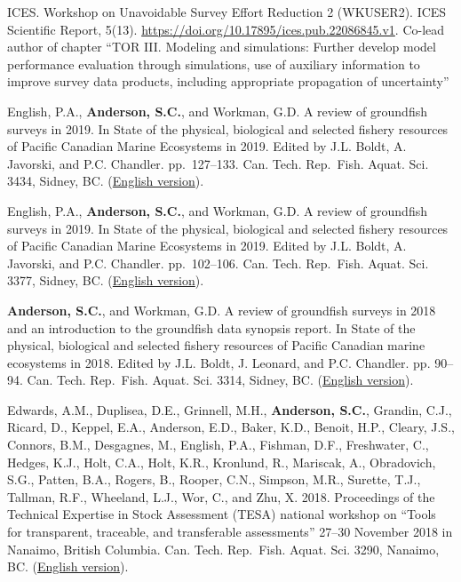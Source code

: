 \begin{description}
\tightlist
\item[2023]
ICES. Workshop on Unavoidable Survey Effort Reduction 2 (WKUSER2). ICES
Scientific Report, 5(13).
\url{https://doi.org/10.17895/ices.pub.22086845.v1}. Co-lead author of
chapter ``TOR III. Modeling and simulations: Further develop model
performance evaluation through simulations, use of auxiliary information
to improve survey data products, including appropriate propagation of
uncertainty''
\item[2021]
English, P.A., \textbf{Anderson, S.C.}, and Workman, G.D. A review of
groundfish surveys in 2019. In State of the physical, biological and
selected fishery resources of Pacific Canadian Marine Ecosystems in
2019. Edited by J.L. Boldt, A. Javorski, and P.C. Chandler.
pp.\ 127--133. Can. Tech. Rep.\ Fish. Aquat. Sci. 3434, Sidney, BC.
(\href{https://publications.gc.ca/site/eng/9.900827/publication.html}{English
version}).
\item[2020]
English, P.A., \textbf{Anderson, S.C.}, and Workman, G.D. A review of
groundfish surveys in 2019. In State of the physical, biological and
selected fishery resources of Pacific Canadian Marine Ecosystems in
2019. Edited by J.L. Boldt, A. Javorski, and P.C. Chandler.
pp.\ 102--106. Can. Tech. Rep.\ Fish. Aquat. Sci. 3377, Sidney, BC.
(\href{https://www.dfo-mpo.gc.ca/oceans/publications/soto-rceo/2019/index-eng.html}{English
version}).
\item[2019]
\textbf{Anderson, S.C.}, and Workman, G.D. A review of groundfish
surveys in 2018 and an introduction to the groundfish data synopsis
report. In State of the physical, biological and selected fishery
resources of Pacific Canadian marine ecosystems in 2018. Edited by J.L.
Boldt, J. Leonard, and P.C. Chandler. pp. 90--94. Can. Tech. Rep.\ Fish.
Aquat. Sci. 3314, Sidney, BC.
(\href{https://www.dfo-mpo.gc.ca/oceans/publications/soto-rceo/2018/index-eng.html}{English
version}).
\item[2018]
Edwards, A.M., Duplisea, D.E., Grinnell, M.H., \textbf{Anderson, S.C.},
Grandin, C.J., Ricard, D., Keppel, E.A., Anderson, E.D., Baker, K.D.,
Benoit, H.P., Cleary, J.S., Connors, B.M., Desgagnes, M., English, P.A.,
Fishman, D.F., Freshwater, C., Hedges, K.J., Holt, C.A., Holt, K.R.,
Kronlund, R., Mariscak, A., Obradovich, S.G., Patten, B.A., Rogers, B.,
Rooper, C.N., Simpson, M.R., Surette, T.J., Tallman, R.F., Wheeland,
L.J., Wor, C., and Zhu, X. 2018. Proceedings of the Technical Expertise
in Stock Assessment (TESA) national workshop on ``Tools for transparent,
traceable, and transferable assessments'' 27--30 November 2018 in
Nanaimo, British Columbia. Can. Tech. Rep.\ Fish. Aquat. Sci. 3290,
Nanaimo, BC.
(\href{https://waves-vagues.dfo-mpo.gc.ca/Library/40750152.pdf}{English
version}).
\end{description}

